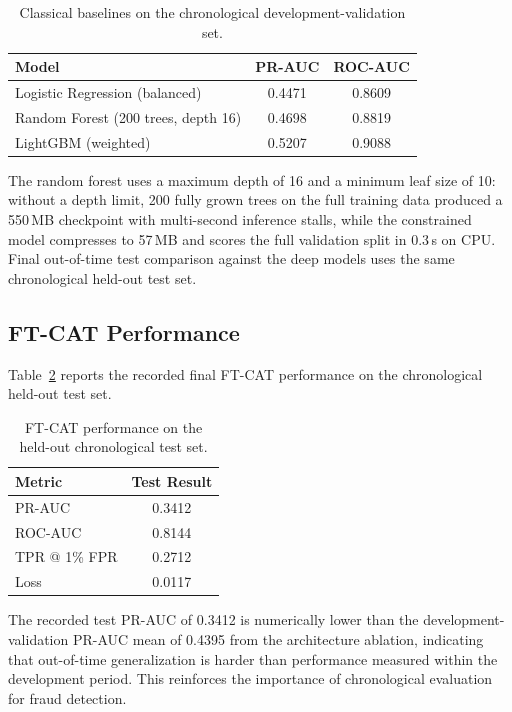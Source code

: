 \documentclass[conference]{IEEEtran}
\begin{document}
\begin{table}[t]
\caption{Classical baselines on the chronological development-validation set.}
\label{tab:baselines}
\centering
\begin{tabular}{@{}lcc@{}}
\toprule
Model & PR-AUC & ROC-AUC \\
\midrule
Logistic Regression (balanced) & 0.4471 & 0.8609 \\
Random Forest (200 trees, depth 16) & 0.4698 & 0.8819 \\
LightGBM (weighted) & 0.5207 & 0.9088 \\
\bottomrule
\end{tabular}
\end{table}

The random forest uses a maximum depth of 16 and a minimum leaf size of 10:
without a depth limit, 200 fully grown trees on the full training data
produced a 550\,MB checkpoint with multi-second inference stalls, while the
constrained model compresses to 57\,MB and scores the full validation split
in 0.3\,s on CPU. Final out-of-time test comparison against the deep models
uses the same chronological held-out test set.

\subsection{FT-CAT Performance}

Table~\ref{tab:ftcat} reports the recorded final FT-CAT performance on the
chronological held-out test set.

\begin{table}[t]
\caption{FT-CAT performance on the held-out chronological test set.}
\label{tab:ftcat}
\centering
\begin{tabular}{@{}lc@{}}
\toprule
Metric & Test Result \\
\midrule
PR-AUC & 0.3412 \\
ROC-AUC & 0.8144 \\
TPR @ 1\% FPR & 0.2712 \\
Loss & 0.0117 \\
\bottomrule
\end{tabular}
\end{table}

The recorded test PR-AUC of 0.3412 is numerically lower than the
development-validation PR-AUC mean of 0.4395 from the architecture ablation,
indicating that out-of-time generalization is harder than performance measured
within the development period. This reinforces the importance of chronological
evaluation for fraud detection.
\end{document}
